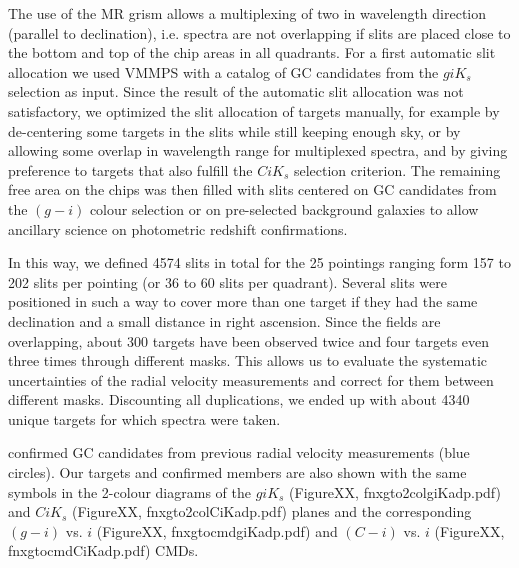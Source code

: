\documentclass[useAMS,usenatbib]{mn2e}
\begin{document}
The use of the MR grism allows a multiplexing of two in wavelength direction 
(parallel to declination), i.e. spectra are not overlapping if slits are placed 
close to the bottom and top of the chip areas in all quadrants. 
For a first automatic slit allocation we used VMMPS with a catalog of GC 
candidates from the $giK_s$ selection as input. Since the result of the 
automatic slit allocation was not satisfactory, we optimized the slit 
allocation of targets manually, for example by de-centering some targets in the 
slits while still keeping enough sky, or by allowing some overlap in wavelength 
range for multiplexed spectra, and by giving preference to targets that also 
fulfill the $CiK_s$ selection criterion. The remaining free area on the chips 
was then filled with slits centered on GC candidates from the $(g-i)$ colour 
selection or on pre-selected background galaxies to allow ancillary science on 
photometric redshift confirmations.

In this way, we defined 4574 slits in total for the 25 pointings ranging form 
157 to 202 slits per pointing (or 36 to 60 slits per quadrant). Several slits 
were positioned in such a way to cover more than one target if they had the 
same declination and a small distance in right ascension. Since the fields are 
overlapping, about 300 targets have been observed twice and four targets even 
three times through different masks. This allows us to evaluate the systematic 
uncertainties of the radial velocity measurements and correct for them between 
different masks. Discounting all duplications, we ended up with about 4340 
unique targets
for which spectra were taken. 

confirmed GC candidates from previous  radial velocity measurements (blue 
circles). Our targets and confirmed  members are also shown with the same 
symbols in the 2-colour diagrams of the $giK_s$ (FigureXX, 
fnxgto2colgiKadp.pdf) and $CiK_s$ (FigureXX, fnxgto2colCiKadp.pdf) planes and 
the corresponding $(g-i)$ vs. $i$ (FigureXX, fnxgtocmdgiKadp.pdf) and $(C-i)$ 
vs. $i$ (FigureXX, fnxgtocmdCiKadp.pdf) CMDs.
\end{document}
